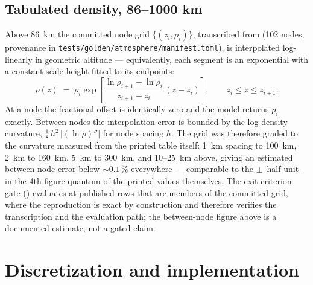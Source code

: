 \subsection{Tabulated density, 86--1000 km}
\label{sec:ussa76:upper}

Above \qty{86}{\kilo\metre} the committed node grid
$\{(z_i, \rho_i)\}$, transcribed from \cite[Part~4, Table~I, pp.~68--73]
{ussa1976} (102 nodes; provenance in
\texttt{tests/golden/atmosphere/manifest.toml}), is interpolated
log-linearly in geometric altitude --- equivalently, each segment is an
exponential with a constant scale height fitted to its endpoints:
\begin{equation}
  \rho(z) \;=\; \rho_i
  \exp\!\left[\frac{\ln \rho_{i+1} - \ln \rho_i}{z_{i+1} - z_i}
  \,(z - z_i)\right],
  \qquad z_i \le z \le z_{i+1}.
  \label{eq:ussa76:interp}
\end{equation}
At a node the fractional offset is identically zero and the model returns
$\rho_i$ exactly. Between nodes the interpolation error is bounded by the
log-density curvature, $\tfrac{1}{8}\,h^2 \,|\!\left(\ln\rho\right)''|$ for
node spacing $h$. The grid was therefore graded to the curvature measured
from the printed table itself: \qty{1}{\kilo\metre} spacing to
\qty{100}{\kilo\metre}, \qty{2}{\kilo\metre} to \qty{160}{\kilo\metre},
\qty{5}{\kilo\metre} to \qty{300}{\kilo\metre}, and 10--25~km above, giving
an estimated between-node error below $\sim 0.1\,\%$ everywhere ---
comparable to the $\pm$~half-unit-in-the-4th-figure quantum of the printed
values themselves. The exit-criterion gate
() evaluates at published rows that are members of
the committed grid, where the reproduction is exact by construction and
therefore verifies the transcription and the evaluation path; the
between-node figure above is a documented estimate, not a gated claim.

\section{Discretization and implementation}
\label{sec:ussa76:implementation}

